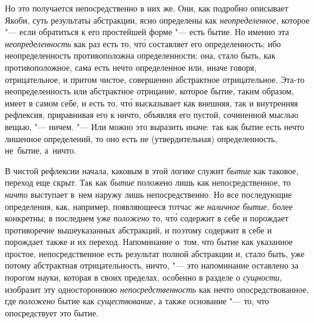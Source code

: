 Но это получается непосредственно в них же. Они, как подробно описывает Якоби,
суть результаты абстракции, ясно определены как {\em неопределенное,} которое
"--- если обратиться к его простейшей форме "--- есть бытие. Но именно эта
{\em неопределенность} как раз есть то, чт\'{о} составляет его определенность;
ибо неопределенность противоположна определенности; она, стало быть, как
противоположное, сама есть нечто определенное или, иначе говоря, отрицательное,
и притом чистое, совершенно абстрактное отрицательное. Эта-то неопределенность
или абстрактное отрицание, которое бытие, таким образом, имеет в самом себе, и
есть то, чт\'{о} высказывает как внешняя, так и внутренняя рефлексия,
приравнивая его к ничто, объявляя его пустой, сочиненной мыслью вещью,
"--- ничем. "--- Или можно это выразить иначе: так как бытие есть нечто
лишенное определений, то оно есть не (утвердительная) определенность, не~бытие,
а~ничто.

В чистой рефлексии начала, каковым в этой логике служит {\em бытие} как
таковое, переход еще скрыт. Так как {\em бытие} положено лишь как
непосредственное, то {\em ничто} выступает в~нем наружу лишь непосредственно.
Но все последующие определения, как, например, появляющееся тотчас же
{\em наличное бытие,} более конкретны; в последнем уже {\em положено} то,
чт\'{о} содержит в себе и порождает противоречие вышеуказанных абстракций, и
поэтому содержит в себе и порождает также и их переход. Напоминание
о~том, что бытие как указанное простое, непосредственное есть
результат полной абстракции и, стало быть, уже потому абстрактная
отрицательность, ничто, "--- это напоминание оставлено за порогом науки,
которая в своих пределах, особенно в разделе о {\em сущности,} изобразит
эту одностороннюю {\em непосредственность} как нечто опосредствованное,
где {\em положено} бытие как {\em существование,} а также основание "---
то, что опосредствует это бытие.

